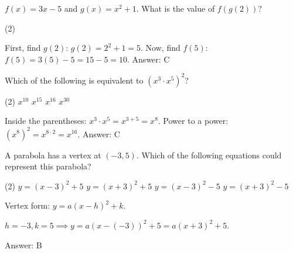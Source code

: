 \documentclass[11pt,paper=a4,answers]{exam}
\begin{document}
\begin{questions}
\vspace{1cm}

\question
$f(x) = 3x - 5$ and $g(x) = x^2 + 1$. What is the value of $f(g(2))$?
\begin{tasks}(2)
       
\end{tasks}

\begin{solution}
First, find $g(2)$: $g(2) = 2^2 + 1 = 5$.
\vspace{5pt}
Now, find $f(5)$: $f(5) = 3(5) - 5 = 15 - 5 = 10$.
\vspace{5pt}
Answer: \colorbox{yellow!100}{C}
\end{solution}

\vspace{1cm}

\question
Which of the following is equivalent to $(x^3 \cdot x^5)^2$?
\begin{tasks}(2)
    \task $x^{10}$ \task $x^{15}$ \task $x^{16}$ \task $x^{30}$
\end{tasks}

\begin{solution}
Inside the parentheses: $x^3 \cdot x^5 = x^{3+5} = x^8$.
\vspace{5pt}
Power to a power: $(x^8)^2 = x^{8 \cdot 2} = x^{16}$.
\vspace{5pt}
Answer: \colorbox{yellow!100}{C}
\end{solution}

\vspace{1cm}

\question
A parabola has a vertex at $(-3, 5)$. Which of the following equations could represent this parabola?
\begin{tasks}(2)
    \task $y = (x-3)^2 + 5$
    \task $y = (x+3)^2 + 5$
    \task $y = (x-3)^2 - 5$
    \task $y = (x+3)^2 - 5$
\end{tasks}

\begin{solution}
Vertex form: $y = a(x - h)^2 + k$.
\vspace{5pt}
\begin{center}
$h = -3, k = 5 \implies y = a(x - (-3))^2 + 5 = a(x + 3)^2 + 5$.
\end{center}
\vspace{5pt}
Answer: \colorbox{yellow!100}{B}
\end{solution}

\vspace{1cm}


\end{questions}
\end{document}
